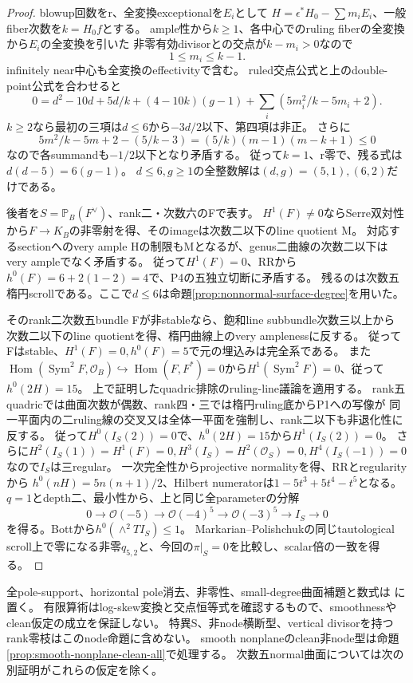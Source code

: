 \documentclass[a4paper,11pt]{ltjsarticle}
\theoremstyle{definition}
\begin{document}
\begin{proof}
blowup回数をr、全変換exceptionalを$E_i$として
$H=\epsilon^*H_0-\sum m_iE_i$、一般fiber次数を$k=H_0f$とする。
ample性から$k\ge1$、各中心でのruling fiberの全変換から$E_i$の全変換を引いた
非零有効divisorとの交点が$k-m_i>0$なので
\[
 1\le m_i\le k-1.
\]
infinitely near中心も全変換のeffectivityで含む。
ruled交点公式と上のdouble-point公式を合わせると
\[
 0=d^2-10d+5d/k+(4-10k)(g-1)
       +\sum_i(5m_i^2/k-5m_i+2).
\]
$k\ge2$なら最初の三項は$d\le6$から$-3d/2$以下、第四項は非正。
さらに
\[
 5m^2/k-5m+2-(5/k-3)=(5/k)(m-1)(m-k+1)\le0
\]
なので各summandも$-1/2$以下となり矛盾する。
従って$k=1$、r零で、残る式は$d(d-5)=6(g-1)$。
$d\le6,g\ge1$の全整数解は$(d,g)=(5,1),(6,2)$だけである。

後者を$S=\mathbb P_B(F^\vee)$、rank二・次数六のFで表す。
$H^1(F)\ne0$ならSerre双対性から$F\to K_B$の非零射を得、そのimageは次数二以下のline quotient M。
対応するsectionへのvery ample Hの制限もMとなるが、genus二曲線の次数二以下はvery ampleでなく矛盾する。
従って$H^1(F)=0$、RRから$h^0(F)=6+2(1-2)=4$で、P4の五独立切断に矛盾する。
残るのは次数五楕円scrollである。ここで$d\le6$は命題\ref{prop:nonnormal-surface-degree}を用いた。

そのrank二次数五bundle Fが非stableなら、飽和line subbundle次数三以上から
次数二以下のline quotientを得、楕円曲線上のvery amplenessに反する。
従ってFはstable、$H^1(F)=0,h^0(F)=5$で元の埋込みは完全系である。
また$\operatorname{Hom}(\operatorname{Sym}^2F,\mathcal O_B)
\hookrightarrow\operatorname{Hom}(F,F^*)=0$から$H^1(\operatorname{Sym}^2F)=0$、従って$h^0(2H)=15$。
上で証明したquadric排除のruling-line議論を適用する。
rank五quadricでは曲面次数が偶数、rank四・三では楕円ruling底からP1への写像が
同一平面内の二ruling線の交叉又は全体一平面を強制し、rank二以下も非退化性に反する。
従って$H^0(I_S(2))=0$で、$h^0(2H)=15$から$H^1(I_S(2))=0$。
さらに$H^2(I_S(1))=H^1(F)=0,H^3(I_S)=H^2(\mathcal O_S)=0,H^4(I_S(-1))=0$なので$I_S$は三regular。
一次完全性からprojective normalityを得、RRとregularityから
$h^0(nH)=5n(n+1)/2$、Hilbert numeratorは$1-5t^3+5t^4-t^5$となる。
$q=1$とdepth二、最小性から、上と同じ全parameterの分解
\[
 0\to\mathcal O(-5)\to\mathcal O(-4)^5\to\mathcal O(-3)^5\to I_S\to0
\]
を得る。Bottから$h^0(\wedge^2T I_S)\le1$。
Markarian--Polishchukの同じtautological scroll上で零になる非零$q_{5,2}$と、今回の$\pi|_S=0$を比較し、scalar倍の一致を得る。
\end{proof}
全pole-support、horizontal pole消去、非零性、small-degree曲面補題と数式は
に置く。
有限算術はlog-skew変換と交点恒等式を確認するもので、smoothnessやclean仮定の成立を保証しない。
特異S、非node横断型、vertical divisorを持つrank零枝はこのnode命題に含めない。
smooth nonplaneのclean非node型は命題\ref{prop:smooth-nonplane-clean-all}で処理する。
次数五normal曲面については次の別証明がこれらの仮定を除く。
\end{document}
